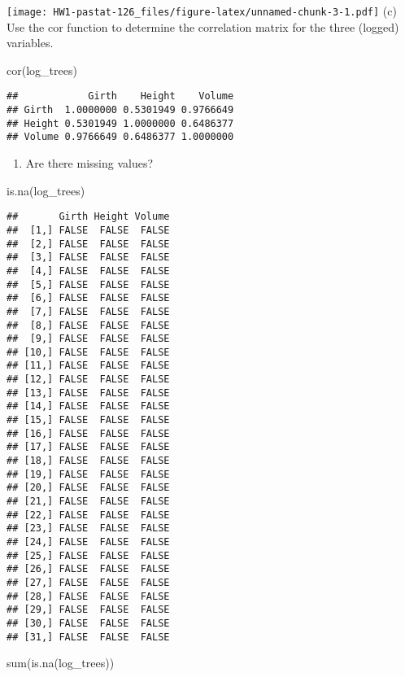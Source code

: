 \documentclass[
]{article}
\newenvironment{Shaded}{\begin{snugshade}}{\end{snugshade}}
\newcommand{\FunctionTok}[1]{\textcolor[rgb]{0.00,0.00,0.00}{#1}}
\newcommand{\NormalTok}[1]{#1}
\providecommand{\tightlist}{%
  \setlength{\itemsep}{0pt}\setlength{\parskip}{0pt}}
\begin{document}
\texttt{[image: HW1-pastat-126\_files/figure-latex/unnamed-chunk-3-1.pdf]}
(c) Use the cor function to determine the correlation matrix for the
three (logged) variables.

\begin{Shaded}
\begin{Highlighting}[]
\FunctionTok{cor}\NormalTok{(log\_trees)}
\end{Highlighting}
\end{Shaded}

\begin{verbatim}
##            Girth    Height    Volume
## Girth  1.0000000 0.5301949 0.9766649
## Height 0.5301949 1.0000000 0.6486377
## Volume 0.9766649 0.6486377 1.0000000
\end{verbatim}

\begin{enumerate}
\def\labelenumi{(\alph{enumi})}
\setcounter{enumi}{3}
\tightlist
\item
  Are there missing values?
\end{enumerate}

\begin{Shaded}
\begin{Highlighting}[]
\FunctionTok{is.na}\NormalTok{(log\_trees)}
\end{Highlighting}
\end{Shaded}

\begin{verbatim}
##       Girth Height Volume
##  [1,] FALSE  FALSE  FALSE
##  [2,] FALSE  FALSE  FALSE
##  [3,] FALSE  FALSE  FALSE
##  [4,] FALSE  FALSE  FALSE
##  [5,] FALSE  FALSE  FALSE
##  [6,] FALSE  FALSE  FALSE
##  [7,] FALSE  FALSE  FALSE
##  [8,] FALSE  FALSE  FALSE
##  [9,] FALSE  FALSE  FALSE
## [10,] FALSE  FALSE  FALSE
## [11,] FALSE  FALSE  FALSE
## [12,] FALSE  FALSE  FALSE
## [13,] FALSE  FALSE  FALSE
## [14,] FALSE  FALSE  FALSE
## [15,] FALSE  FALSE  FALSE
## [16,] FALSE  FALSE  FALSE
## [17,] FALSE  FALSE  FALSE
## [18,] FALSE  FALSE  FALSE
## [19,] FALSE  FALSE  FALSE
## [20,] FALSE  FALSE  FALSE
## [21,] FALSE  FALSE  FALSE
## [22,] FALSE  FALSE  FALSE
## [23,] FALSE  FALSE  FALSE
## [24,] FALSE  FALSE  FALSE
## [25,] FALSE  FALSE  FALSE
## [26,] FALSE  FALSE  FALSE
## [27,] FALSE  FALSE  FALSE
## [28,] FALSE  FALSE  FALSE
## [29,] FALSE  FALSE  FALSE
## [30,] FALSE  FALSE  FALSE
## [31,] FALSE  FALSE  FALSE
\end{verbatim}

\begin{Shaded}
\begin{Highlighting}[]
\FunctionTok{sum}\NormalTok{(}\FunctionTok{is.na}\NormalTok{(log\_trees))}
\end{Highlighting}
\end{Shaded}
\end{document}
